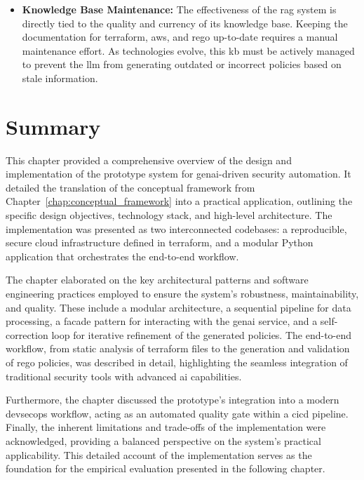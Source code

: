 \begin{itemize}
    \item \textbf{Knowledge Base Maintenance:} The effectiveness of the \gls{rag} system is directly tied to the quality and currency of its knowledge base. Keeping the documentation for \gls{terraform}, \gls{aws}, and \gls{rego} up-to-date requires a manual maintenance effort. As technologies evolve, this \gls{kb} must be actively managed to prevent the \gls{llm} from generating outdated or incorrect policies based on stale information.
\end{itemize}

\section{Summary}

This chapter provided a comprehensive overview of the design and implementation of the prototype system for \gls{genai}-driven security automation. It detailed the translation of the conceptual framework from Chapter~\ref{chap:conceptual_framework} into a practical application, outlining the specific design objectives, technology stack, and high-level architecture. The implementation was presented as two interconnected codebases: a reproducible, secure cloud infrastructure defined in \gls{terraform}, and a modular Python application that orchestrates the end-to-end workflow.

The chapter elaborated on the key architectural patterns and software engineering practices employed to ensure the system's robustness, maintainability, and quality. These include a modular architecture, a sequential pipeline for data processing, a facade pattern for interacting with the \gls{genai} service, and a self-correction loop for iterative refinement of the generated policies. The end-to-end workflow, from static analysis of \gls{terraform} files to the generation and validation of \gls{rego} policies, was described in detail, highlighting the seamless integration of traditional security tools with advanced \gls{ai} capabilities.

Furthermore, the chapter discussed the prototype's integration into a modern \gls{devsecops} workflow, acting as an automated quality gate within a \gls{cicd} pipeline. Finally, the inherent limitations and trade-offs of the implementation were acknowledged, providing a balanced perspective on the system's practical applicability. This detailed account of the implementation serves as the foundation for the empirical evaluation presented in the following chapter.
